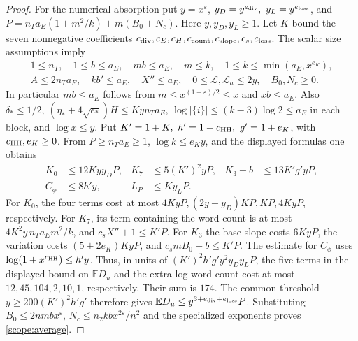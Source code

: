 \begin{proof}
For the numerical absorption put \(y=x^\varepsilon\),
\(y_D=y^{e_{\rm div}},\ y_L=y^{e_{\rm loss}}\), and
\(P=n_Ta_E(1+m^2/k)+m(B_0+N_c)\). Here \(y,y_D,y_L\ge1\).
Let \(K\) bound the seven nonnegative coefficients
\(c_{\rm div},c_E,c_H,c_{\rm count},c_{\rm slope},c_s,c_{\rm loss}\).
The scalar size assumptions imply
\[
\begin{gathered}
 1\le n_T,\quad 1\le b\le a_E,\quad mb\le a_E,\quad
 m\le k,\quad 1\le k\le\min(a_E,x^{e_K}),\\
 A\le2n_Ta_E,\quad kb'\le a_E,\quad X''\le a_E,\quad
 0\le\mathcal L,\mathcal L_a\le2y,\quad B_0,N_c\ge0 .
\end{gathered}
\]
In particular \(mb\le a_E\) follows from \(m\le x^{(1+\varepsilon)/2}
\le x\) and \(xb\le a_E\). Also
\(\delta_*\le1/2,\ (\eta_*+4\sqrt{e_*})H\le Kyn_Ta_E\),
\(\log|\{i\}|\le(k-3)\log2\le a_E\) in each block, and
\(\log x\le y\). Put \(K'=1+K,\ h'=1+c_{\rm HH},\ g'=1+e_K\),
with \(c_{\rm HH},e_K\ge0\). From \(P\ge n_Ta_E\ge1\),
\(\log k\le e_K y\), and the displayed formulas one obtains
\[
\begin{aligned}
 K_0&\le12K y y_D P,&
 K_7&\le5(K')^2yP,&
 K_3+b&\le13K'g'yP,\\
 C_\phi&\le8h'y,& L_P&\le K y_L P.&
\end{aligned}
\]
For \(K_0\), the four terms cost at most
\(4KyP,(2y+y_D)KP,KP,4KyP\), respectively.
For \(K_7\), its term containing the word count is at most
\(4K^2y\,n_Ta_E m^2/k\), and \(c_sX''+1\le K'P\).
For \(K_3\) the base slope costs \(6KyP\), the variation costs
\((5+2e_K)KyP\), and \(c_s mB_0+b\le K'P\).
The estimate for \(C_\phi\) uses \(\log(1+x^{c_{\rm HH}})\le h'y\).
Thus, in units of \((K')^2h'g'y^2y_Dy_LP\), the five terms in the
displayed bound on \(\mathbb E D_u\) and the extra log word count
cost at most \(12,45,104,2,10,1\), respectively.
Their sum is \(174\). The common threshold \(y\ge200(K')^2h'g'\)
therefore gives \(\mathbb E D_u\le y^{3+e_{\rm div}+e_{\rm loss}}P\).
Substituting \(B_0\le2nmbx^\varepsilon\),
\(N_c\le n_2kb x^{2\varepsilon}/n^2\) and the specialized exponents
proves \eqref{scope:average}.
\end{proof}


